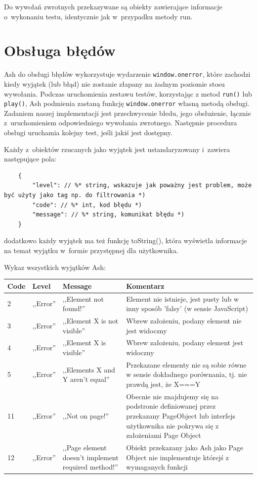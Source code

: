 \documentclass[brudnopis]{xmgr}
\begin{document}
Do wywołań zwrotnych przekazywane są obiekty zawierające informacje o~wykonaniu testu, identycznie jak w~przypadku metody run.

\section{Obsługa błędów}

Ash do obsługi błędów wykorzystuje wydarzenie \texttt{window.onerror}, które zachodzi kiedy wyjątek (lub błąd) nie zostanie złapany na żadnym poziomie stosu wywołania. Podczas uruchomienia zestawu testów, korzystając z metod \texttt{run()} lub \texttt{play()}, Ash podmienia zastaną funkcję \texttt{window.onerror} własną metodą obsługi. Zadaniem naszej implementacji jest przechwycenie błedu, jego obsłużenie, łącznie z~uruchomieniem odpowiedniego wywołania zwrotnego. Następnie procedura obsługi uruchamia kolejny test, jeśli jakiś jest dostępny. 

Każdy z~obiektów rzucanych jako wyjątek jest ustandaryzowany i~zawiera następujące pola: 

\begin{lstlisting}
	{
		"level": // %* string, wskazuje jak poważny jest problem, może być użyty jako tag np. do filtrowania *) 
		"code": // %* int, kod błędu *)
		"message": // %* string, komunikat błędu *) 
	}
\end{lstlisting}

dodatkowo każdy wyjątek ma też funkcję toString(), która wyświetla informacje na temat wyjątku w~formie przystępnej dla użytkownika.

Wykaz wszystkich wyjątków Ash:

\begin{center}
    \begin{tabularx}{\textwidth}{ | p{1cm} | p{2cm} | X | X |}
    \hline
    Code & Level & Message & Komentarz \\ \hline
    2 & ,,Error'' & ,,Element not found!'' & Element nie istnieje, jest pusty lub w inny sposób 'falsy' (w sensie JavaScript)  \\ \hline
    3 & ,,Error'' & ,,Element X is not visible'' & Wbrew założeniu, podany element nie jest widoczny  \\ \hline
    4 & ,,Error'' & ,,Element X is visible'' & Wbrew założeniu, podany element jest widoczny  \\ \hline
    5 & ,,Error'' & ,,Elements X and Y aren't equal'' & Przekazane elementy nie są sobie równe w sensie dokładnego porównania, tj.  nie prawdą jest, że X===Y  \\ \hline
    11 & ,,Error'' & ,,Not on page!'' & Obecnie nie znajdujemy się na podstronie definiowanej przez przekazany PageObject lub interfejs użytkownika nie pokrywa się z założeniami Page Object  \\ \hline
    12 & ,,Error'' & ,,Page element doesn't implement required method!'' & Obiekt przekazany jako Ash jako Page Object nie implementuje którejś z wymaganych funkcji  \\ \hline
    \end{tabularx}
\end{center}
\end{document}
